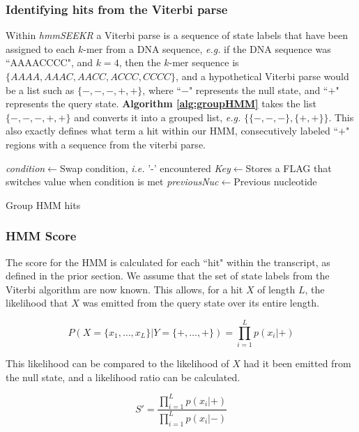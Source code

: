 \subsubsection{Identifying hits from the Viterbi parse}
Within \emph{hmmSEEKR} a Viterbi parse is a sequence of state labels that have been assigned to each $k$-mer from a DNA sequence, \emph{e.g.} if the DNA sequence was ``AAAACCCC", and $k=4$, then the $k$-mer sequence is $\{AAAA,AAAC,AACC,ACCC,CCCC\}$, and a hypothetical Viterbi parse would be a list such as $\{-,-,-,+,+\}$, where ``$-$" represents the null state, and ``$+$" represents the query state. \textbf{Algorithm \ref{alg:groupHMM}} takes the list $\{-,-,-,+,+\}$ and converts it into a grouped list, \emph{e.g.} $\{\{-,-,-\},\{+,+\}\}$. This also exactly defines what term a hit within our HMM, consecutively labeled ``$+$" regions with a sequence from the viterbi parse.
\begin{algorithm}[h]
\DontPrintSemicolon
{}
\SetAlgoLined
{}
\emph{condition}$\leftarrow$Swap condition, \emph{i.e.} '-' encountered\;
\emph{Key}$\leftarrow$Stores a FLAG that switches value when condition is met\;
\emph{previousNuc}$\leftarrow$Previous nucleotide\;
 \caption{Group HMM hits}
 \label{alg:groupHMM}
\end{algorithm}

\subsubsection{HMM Score}
The score for the HMM is calculated for each ``hit" within the transcript, as defined in the prior section. We assume that the set of state labels from the Viterbi algorithm are now known. This allows, for a hit $X$ of length $L$, the likelihood that $X$ was emitted from the query state over its entire length. 

$$P(X=\{x_1,\dots,x_L\} | Y = \{+,\dots,+\}) = \prod_{i=1}^L{p(x_i|+)}$$

This likelihood can be compared to the likelihood of $X$ had it been emitted from the null state, and a likelihood ratio can be calculated.

$$S' = \frac{\prod_{i=1}^L{p(x_i|+)}}{\prod_{i=1}^Lp(x_i|-)}$$

